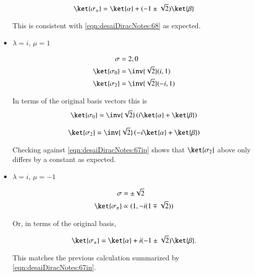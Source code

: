 \begin{itemize}
\begin{align}\label{eqn:desaiDiracNotes:73i}
\ket{\sigma_{\pm}} = \ket{\alpha} + (-1 \pm \sqrt{2}) \ket{\beta}
\end{align}

This is consistent with \ref{eqn:desaiDiracNotes:68} as expected.

\item $\lambda = i$, $\mu = 1$

\begin{align}\label{eqn:desaiDiracNotes:74}
\sigma &= 2,0 \\
\ket{\sigma_0} &= \inv{\sqrt{2}} (i,1) \\
\ket{\sigma_2} &= \inv{\sqrt{2}} (-i,1) 
\end{align}

In terms of the original basis vectors this is 
\begin{align}\label{eqn:desaiDiracNotes:74i}
\ket{\sigma_0} = \inv{\sqrt{2}}\left( i\ket{\alpha} + \ket{\beta} \right)
\end{align}

\begin{align}\label{eqn:desaiDiracNotes:74ii}
\ket{\sigma_2} = \inv{\sqrt{2}}\left( -i\ket{\alpha} + \ket{\beta} \right)
\end{align}

Checking against \ref{eqn:desaiDiracNotes:67ip} shows that $\ket{\sigma_2}$ above only differs by a constant as expected.

\item $\lambda = i$, $\mu = -1$

\begin{align}\label{eqn:desaiDiracNotes:75}
\sigma &= \pm \sqrt{2} \\
\ket{\sigma_{\pm}} &\propto (1, -i(1 \mp \sqrt{2}))
\end{align}

Or, in terms of the original basis,

\begin{align}\label{eqn:desaiDiracNotes:75i}
\ket{\sigma_{\pm}} = \ket{\alpha} + i (-1 \pm \sqrt{2}) \ket{\beta}.
\end{align}

This matches the previous calculation summarized by \ref{eqn:desaiDiracNotes:67in}.

\end{itemize}

\EndArticle
